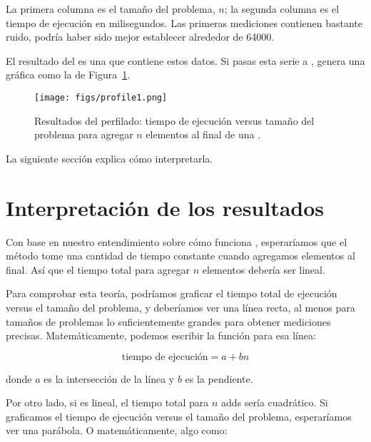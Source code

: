 \documentclass[12pt]{book}
\theoremstyle{exercise}
\begin{document}
La primera columna es el tamaño del problema, $n$; la segunda columna es
el tiempo de ejecución en milisegundos. Las primeras mediciones contienen
bastante ruido, podría haber sido mejor establecer  alrededor de 64000.


El resultado del  es una  que
contiene estos datos. Si pasas esta serie a ,
genera una gráfica como la de Figura~\ref{fig-profile1}.

\begin{figure}
\centering
\texttt{[image: figs/profile1.png]}
\caption{Resultados del perfilado: tiempo de ejecución versus tamaño del problema para
agregar $n$ elementos al final de una .}
\label{fig-profile1}
\end{figure}

La siguiente sección explica cómo interpretarla.


\section{Interpretación de los resultados}\label{interpreting-results}

Con base en nuestro entendimiento sobre cómo funciona ,
esperaríamos que el método  tome una cantidad de tiempo constante
cuando agregamos elementos al final. Así que el tiempo total para agregar $n$
elementos debería ser lineal.


Para comprobar esta teoría, podríamos graficar el tiempo total de ejecución
versus el tamaño del problema, y deberíamos ver una línea recta, al menos
para tamaños de problemas lo suficientemente grandes para obtener mediciones
precisas. Matemáticamente, podemos escribir la función para esa línea:

\newcommand{\runtime}{\mbox{tiempo de ejecución}}

\[ \runtime = a + b n \]

donde $a$ es la intersección de la línea y $b$ es la pendiente.


Por otro lado, si  es lineal, el tiempo total para
$n$ adds sería cuadrático. Si graficamos el tiempo de ejecución versus el tamaño
del problema, esperaríamos ver una parábola. O matemáticamente, algo como:
\end{document}
